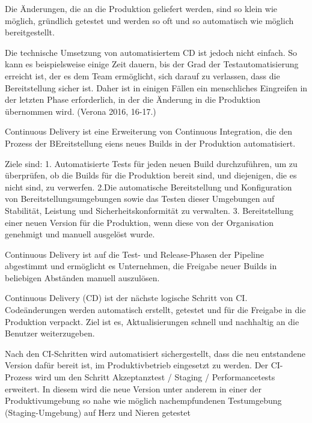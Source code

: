 Die Änderungen, die an die Produktion geliefert werden, sind so klein wie möglich, gründlich getestet und werden so oft und so automatisch wie möglich bereitgestellt.

Die technische Umsetzung von automatisiertem CD ist jedoch nicht einfach. So kann es beispielsweise einige Zeit dauern, bis der Grad der Testautomatisierung erreicht ist, der es dem Team ermöglicht, sich darauf zu verlassen, dass die Bereitstellung sicher ist. Daher ist in einigen Fällen ein menschliches Eingreifen in der letzten Phase erforderlich, in der die Änderung in die Produktion übernommen wird. (Verona 2016, 16-17.) 










Continuous Delivery ist eine Erweiterung von Continuous Integration, die den Prozess der BEreitstellung eiens neues Builds in der Produktion automatisiert.

Ziele sind: 
1. Automatisierte Tests für jeden neuen Build durchzuführen, um zu überprüfen, ob die Builds für die Produktion bereit sind, und diejenigen, die es nicht sind, zu verwerfen.
2.Die automatische Bereitstellung und Konfiguration von Bereitstellungsumgebungen sowie das Testen dieser Umgebungen auf Stabilität, Leistung und Sicherheitskonformität zu verwalten. 
3. Bereitstellung einer neuen Version für die Produktion, wenn diese von der Organisation genehmigt und manuell ausgelöst wurde.


Continuous Delivery ist auf die Test- und Release-Phasen der Pipeline abgestimmt und ermöglicht es Unternehmen, die Freigabe neuer Builds in beliebigen Abständen manuell auszulösen.




Continuous Delivery (CD) ist der nächste logische Schritt von CI. Codeänderungen werden automatisch erstellt, getestet und für die Freigabe in die Produktion verpackt. Ziel ist es, Aktualisierungen schnell und nachhaltig an die Benutzer weiterzugeben.


Nach den CI-Schritten wird automatisiert sichergestellt, dass die neu entstandene Version dafür bereit ist, im Produktivbetrieb eingesetzt zu werden. Der CI-Prozess wird um den
Schritt Akzeptanztest / Staging / Performancetests erweitert. In diesem wird die neue Version
unter anderem in einer der Produktivumgebung so nahe wie möglich nachempfundenen
Testumgebung (Staging-Umgebung) auf Herz und Nieren getestet 



